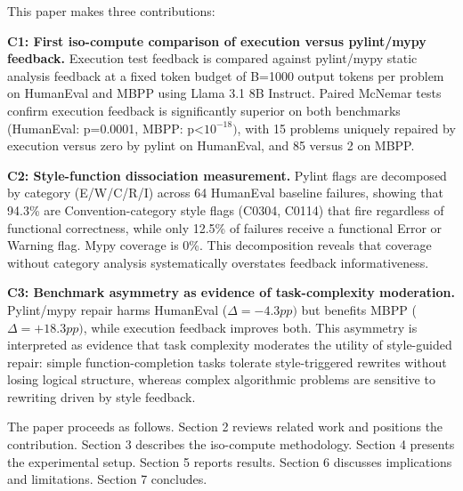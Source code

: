 This paper makes three contributions:

\textbf{C1: First iso-compute comparison of execution versus pylint/mypy feedback.} Execution test feedback is compared against pylint/mypy static analysis feedback at a fixed token budget of B=1000 output tokens per problem on HumanEval and MBPP using Llama 3.1 8B Instruct. Paired McNemar tests confirm execution feedback is significantly superior on both benchmarks (HumanEval: p=0.0001, MBPP: p<$10^{-18})$, with 15 problems uniquely repaired by execution versus zero by pylint on HumanEval, and 85 versus 2 on MBPP.

\textbf{C2: Style-function dissociation measurement.} Pylint flags are decomposed by category (E/W/C/R/I) across 64 HumanEval baseline failures, showing that 94.3\% are Convention-category style flags (C0304, C0114) that fire regardless of functional correctness, while only 12.5\% of failures receive a functional Error or Warning flag. Mypy coverage is 0\%. This decomposition reveals that coverage without category analysis systematically overstates feedback informativeness.

\textbf{C3: Benchmark asymmetry as evidence of task-complexity moderation.} Pylint/mypy repair harms HumanEval ($\Delta =-4.3pp)$ but benefits MBPP ($\Delta =+18.3pp)$, while execution feedback improves both. This asymmetry is interpreted as evidence that task complexity moderates the utility of style-guided repair: simple function-completion tasks tolerate style-triggered rewrites without losing logical structure, whereas complex algorithmic problems are sensitive to rewriting driven by style feedback.

The paper proceeds as follows. Section 2 reviews related work and positions the contribution. Section 3 describes the iso-compute methodology. Section 4 presents the experimental setup. Section 5 reports results. Section 6 discusses implications and limitations. Section 7 concludes.

